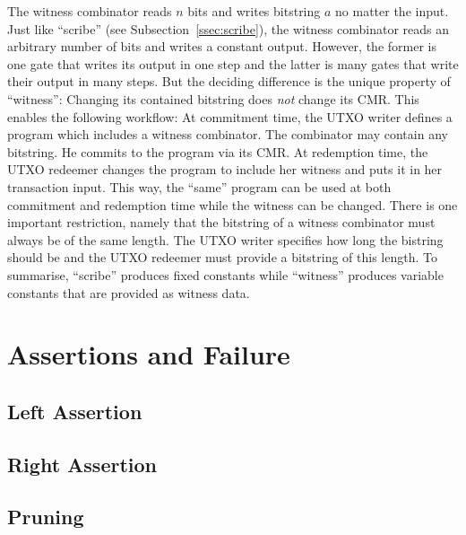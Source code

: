 
%
The witness combinator reads $n$ bits and writes bitstring $a$ no matter the input.
Just like \enquote{scribe} (see Subsection~\ref{ssec:scribe}),
the witness combinator reads an arbitrary number of bits and writes a constant output.
However,
the former is one gate that writes its output in one step
and the latter is many gates that write their output in many steps.
But the deciding difference is the unique property of \enquote{witness}:
Changing its contained bitstring does \emph{not} change its CMR.
This enables the following workflow:
At commitment time,
the UTXO writer defines a program which includes a witness combinator.
The combinator may contain any bitstring.
He commits to the program via its CMR.
At redemption time,
the UTXO redeemer changes the program to include her witness and puts it in her transaction input.
This way,
the \enquote{same} program can be used at both commitment and redemption time
while the witness can be changed.
There is one important restriction,
namely that the bitstring of a witness combinator must always be of the same length.
The UTXO writer specifies how long the bistring should be and the UTXO redeemer must provide a bitstring of this length.
%
To summarise,
\enquote{scribe} produces fixed constants while \enquote{witness} produces variable constants that are provided as witness data.

\section{Assertions and Failure}%
\label{sec:asserts}

\subsection{Left Assertion}



\subsection{Right Assertion}



\subsection{Pruning}

%
%
%

